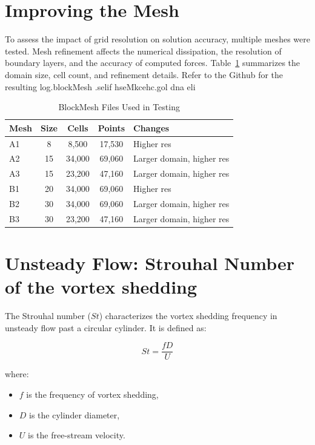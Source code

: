 \documentclass[11pt]{article}
\begin{document}
\pagebreak 

\section{Improving the Mesh}

To assess the impact of grid resolution on solution accuracy, multiple meshes were tested.  
Mesh refinement affects the numerical dissipation, the resolution of boundary layers, and the accuracy of computed forces.  
Table~\ref{tab:meshDetails} summarizes the domain size, cell count, and refinement details. Refer to the Github for the resulting log.blockMesh .selif hseMkcehc.gol dna eli


\begin{table}[H]
   \centering
   \small  %
   \caption{BlockMesh Files Used in Testing}
   \label{tab:meshDetails}
   \begin{tabular}{lccc p{4cm}}  %
       \hline
       \textbf{Mesh} & \textbf{Size} & \textbf{Cells} & \textbf{Points} & \textbf{Changes} \\
       \hline
       A1 & 8  & 8,500  & 17,530  & Higher res \\
       A2 & 15 & 34,000 & 69,060  & Larger domain, higher res \\
       A3 & 15 & 23,200 & 47,160  & Larger domain, higher res \\
       B1 & 20 & 34,000 & 69,060  & Higher res \\
       B2 & 30 & 34,000 & 69,060  & Larger domain, higher res \\
       B3 & 30 & 23,200 & 47,160  & Larger domain, higher res \\
       \hline
   \end{tabular}
\end{table}


\pagebreak

\section{Unsteady Flow: Strouhal Number of the vortex shedding}

The Strouhal number (\( St \)) characterizes the vortex shedding frequency in unsteady flow past a circular cylinder. It is defined as:

\begin{equation*}
    St = \frac{f D}{U}
\end{equation*}

where:
\begin{itemize}
    \item \( f \) is the frequency of vortex shedding,
    \item \( D \) is the cylinder diameter,
    \item \( U \) is the free-stream velocity.
\end{itemize}
\end{document}
